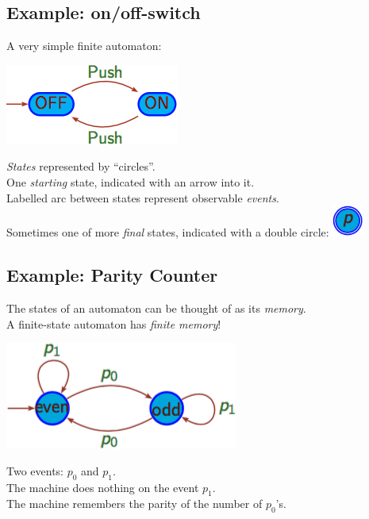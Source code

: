 \subsection{Example: on/off-switch}
\label{sub:Example: on/off-switch}
A very simple finite automaton:
\begin{center}
	\includegraphics[scale=0.5]{onOff.png}
\end{center}
{\color{red} \emph{States}} represented by ``circles''.\\
One {\color{red} \emph{starting}} state, indicated with an arrow into it.\\
Labelled arc between states represent observable {\color{red} \emph{events}}.\\
Sometimes one of more {\color{red} \emph{final}} states,
indicated with a double circle: \includegraphics[scale=0.5]{doubleCircle.png}

\subsection{Example: Parity Counter}
\label{sub:Example: Parity Counter}
The states of an automaton can be thought of as its {\color{red} \emph{memory}}.\\
A finite-state automaton has {\color{red} \emph{finite memory}}!
\begin{center}
	\includegraphics[scale=0.5]{parityCounter.png}
\end{center}
Two events: $p_0$ and $p_1$.\\
The machine does nothing on the event $p_1$.\\
The machine remembers the parity of the number of $p_0$'s.\\
\smallskip

